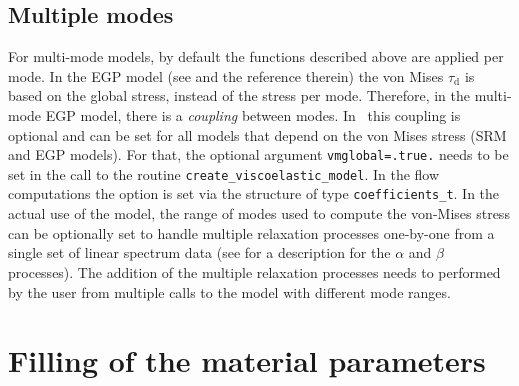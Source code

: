 \subsection{Multiple modes}
For multi-mode models, by default the functions described above are applied per mode. In the EGP model (see \cite{pagani_no_2024} and the reference therein) the von Mises $\tau_\text{d}$ is based on the global stress, instead of the stress per mode. Therefore, in the multi-mode EGP model, there is a \emph{coupling} between modes. In \tfem\ this coupling is optional and can be set for all models that depend on the von Mises stress (SRM and EGP models). For that, the optional argument \texttt{vmglobal=.true.} needs to be set in the call to the routine \texttt{create\_viscoelastic\_model}. In the flow computations the option is set via the structure of type \texttt{coefficients\_t}. In the actual use of the model, the range of modes used to compute the von-Mises stress can be optionally set to handle multiple relaxation processes one-by-one from a single set of linear spectrum data (see \cite{van_breemen_rate_2012} for a description for the $\alpha$ and $\beta$ processes). The addition of the multiple relaxation processes needs to performed by the user from multiple calls to the model with different mode ranges.

\section{Filling of the material parameters}

